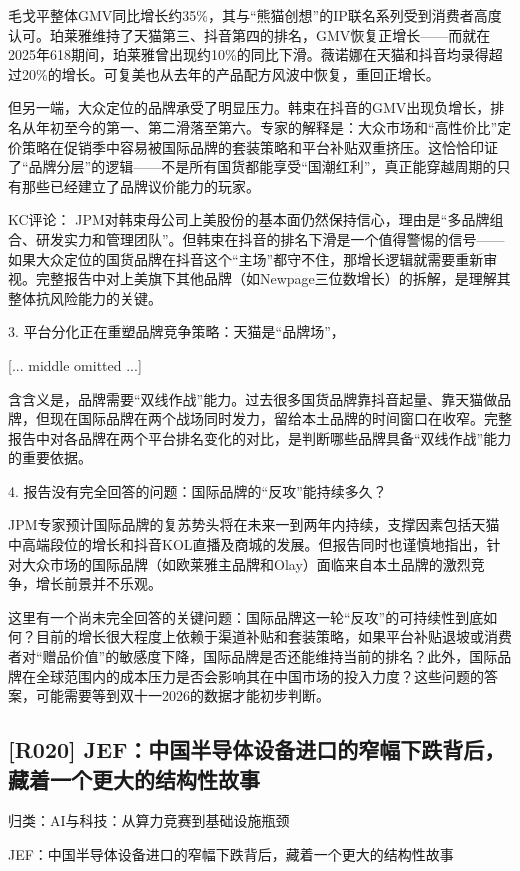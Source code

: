 \documentclass[11pt]{ctexart}
\begin{document}
毛戈平整体GMV同比增长约35\%，其与“熊猫创想”的IP联名系列受到消费者高度认可。珀莱雅维持了天猫第三、抖音第四的排名，GMV恢复正增长——而就在2025年618期间，珀莱雅曾出现约10\%的同比下滑。薇诺娜在天猫和抖音均录得超过20\%的增长。可复美也从去年的产品配方风波中恢复，重回正增长。

但另一端，大众定位的品牌承受了明显压力。韩束在抖音的GMV出现负增长，排名从年初至今的第一、第二滑落至第六。专家的解释是：大众市场和“高性价比”定价策略在促销季中容易被国际品牌的套装策略和平台补贴双重挤压。这恰恰印证了“品牌分层”的逻辑——不是所有国货都能享受“国潮红利”，真正能穿越周期的只有那些已经建立了品牌议价能力的玩家。

KC评论： JPM对韩束母公司上美股份的基本面仍然保持信心，理由是“多品牌组合、研发实力和管理团队”。但韩束在抖音的排名下滑是一个值得警惕的信号——如果大众定位的国货品牌在抖音这个“主场”都守不住，那增长逻辑就需要重新审视。完整报告中对上美旗下其他品牌（如Newpage三位数增长）的拆解，是理解其整体抗风险能力的关键。

3. 平台分化正在重塑品牌竞争策略：天猫是“品牌场”，

[... middle omitted ...]

含含义是，品牌需要“双线作战”能力。过去很多国货品牌靠抖音起量、靠天猫做品牌，但现在国际品牌在两个战场同时发力，留给本土品牌的时间窗口在收窄。完整报告中对各品牌在两个平台排名变化的对比，是判断哪些品牌具备“双线作战”能力的重要依据。

4. 报告没有完全回答的问题：国际品牌的“反攻”能持续多久？

JPM专家预计国际品牌的复苏势头将在未来一到两年内持续，支撑因素包括天猫中高端段位的增长和抖音KOL直播及商城的发展。但报告同时也谨慎地指出，针对大众市场的国际品牌（如欧莱雅主品牌和Olay）面临来自本土品牌的激烈竞争，增长前景并不乐观。

这里有一个尚未完全回答的关键问题：国际品牌这一轮“反攻”的可持续性到底如何？目前的增长很大程度上依赖于渠道补贴和套装策略，如果平台补贴退坡或消费者对“赠品价值”的敏感度下降，国际品牌是否还能维持当前的排名？此外，国际品牌在全球范围内的成本压力是否会影响其在中国市场的投入力度？这些问题的答案，可能需要等到双十一2026的数据才能初步判断。

\subsection{[R020] JEF：中国半导体设备进口的窄幅下跌背后，藏着一个更大的结构性故事}
{\small\color{refgray}归类：AI与科技：从算力竞赛到基础设施瓶颈}

JEF：中国半导体设备进口的窄幅下跌背后，藏着一个更大的结构性故事
\end{document}
